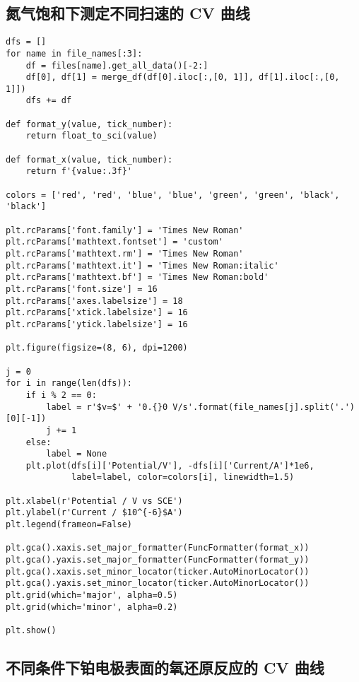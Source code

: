 \subsection{氮气饱和下测定不同扫速的 CV 曲线}\label{cap:2}

\begin{verbatim}
dfs = []
for name in file_names[:3]:
    df = files[name].get_all_data()[-2:]
    df[0], df[1] = merge_df(df[0].iloc[:,[0, 1]], df[1].iloc[:,[0, 1]])
    dfs += df

def format_y(value, tick_number):
    return float_to_sci(value)

def format_x(value, tick_number):
    return f'{value:.3f}'

colors = ['red', 'red', 'blue', 'blue', 'green', 'green', 'black', 'black']

plt.rcParams['font.family'] = 'Times New Roman'
plt.rcParams['mathtext.fontset'] = 'custom'
plt.rcParams['mathtext.rm'] = 'Times New Roman'
plt.rcParams['mathtext.it'] = 'Times New Roman:italic'
plt.rcParams['mathtext.bf'] = 'Times New Roman:bold'
plt.rcParams['font.size'] = 16
plt.rcParams['axes.labelsize'] = 18
plt.rcParams['xtick.labelsize'] = 16
plt.rcParams['ytick.labelsize'] = 16

plt.figure(figsize=(8, 6), dpi=1200)

j = 0
for i in range(len(dfs)):
    if i % 2 == 0:
        label = r'$v=$' + '0.{}0 V/s'.format(file_names[j].split('.')[0][-1])
        j += 1
    else:
        label = None
    plt.plot(dfs[i]['Potential/V'], -dfs[i]['Current/A']*1e6, 
             label=label, color=colors[i], linewidth=1.5)

plt.xlabel(r'Potential / V vs SCE')
plt.ylabel(r'Current / $10^{-6}$A')
plt.legend(frameon=False)

plt.gca().xaxis.set_major_formatter(FuncFormatter(format_x))
plt.gca().yaxis.set_major_formatter(FuncFormatter(format_y))
plt.gca().xaxis.set_minor_locator(ticker.AutoMinorLocator())
plt.gca().yaxis.set_minor_locator(ticker.AutoMinorLocator())
plt.grid(which='major', alpha=0.5)
plt.grid(which='minor', alpha=0.2)

plt.show()    
\end{verbatim}

\subsection{不同条件下铂电极表面的氧还原反应的 CV 曲线}


